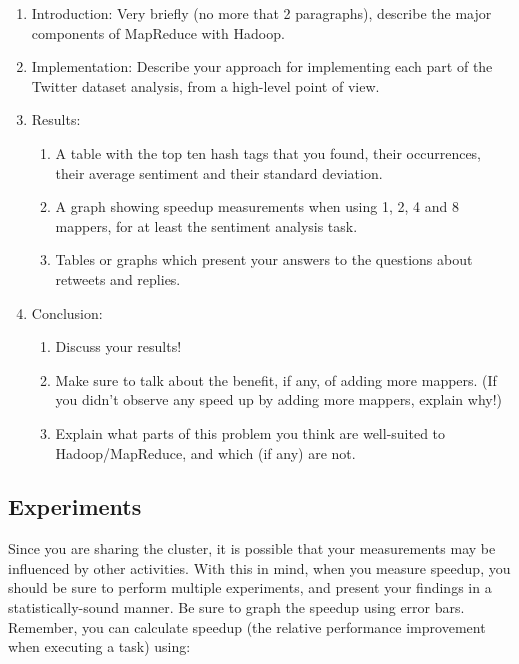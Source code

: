 \documentclass[a4paper,10pt]{article}
\begin{document}
  \begin{enumerate}
    \item Introduction: Very briefly (no more that 2 paragraphs), describe the major components of MapReduce with Hadoop.
    \item Implementation: Describe your approach for implementing each part of the Twitter dataset analysis, from a high-level point of view.
    \item Results: 
    \begin{enumerate}
      \item A table with the top ten hash tags that you found, their occurrences, their average sentiment and their standard deviation.
      \item A graph showing speedup measurements when using 1, 2, 4 and 8 mappers, for at least the sentiment analysis task.
      \item Tables or graphs which present your answers to the questions about retweets and replies.
    \end{enumerate}
    \item Conclusion: 
    \begin{enumerate}
      \item Discuss your results!
      \item Make sure to talk about the benefit, if any, of adding more mappers.
	      (If you didn't observe any speed up by adding more mappers, explain why!)
      \item Explain what parts of this problem you think are well-suited to Hadoop/MapReduce, and which (if any) are not.
    \end{enumerate}
    
  \end{enumerate}
  
  
  \subsection{Experiments}
  Since you are sharing the cluster, it is possible that your measurements may be influenced by other activities.
  With this in mind, when you measure speedup, you should be sure to perform multiple experiments, and present your findings in a statistically-sound manner.
  Be sure to graph the speedup using error bars.
  Remember, you can calculate speedup (the relative performance improvement when executing a task) using:
  
\end{document}
